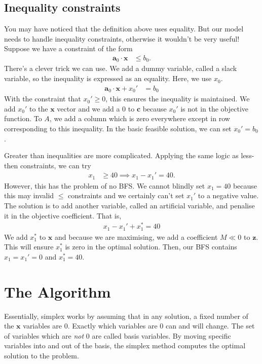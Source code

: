 \documentclass[11pt,a4paper]{article} %
\begin{document}
\subsection{Inequality constraints}
You may have noticed that the definition above uses 
equality. But our model needs to handle inequality constraints, otherwise 
it wouldn't be very useful! Suppose we have a constraint of the form 
\begin{align*}
    \bm a_0 \cdot \bm x &\le b_0.
\end{align*}
There's a clever trick we can use. We add a dummy variable, called a 
slack variable, so the inequality is expressed as an equality. 
Here, we use $x_0$.
\begin{align*}
    \bm a_0 \cdot \bm x + x_0' &= b_0
\end{align*}
With the constraint that $x_0' \ge 0$, this ensures the inequality is 
maintained. 
We add $x_0'$ to the $\bm x$ vector 
and we add a $0$ to $\bm c$ because $x_0'$ is not in the objective function. To $A$, we add 
a column which is zero everywhere except in row corresponding to
this inequality. In the basic feasible solution, we can set 
$x_0' = b_0$.

Greater than inequalities are more complicated. Applying the same logic 
as less-then constraints, we can try
\begin{align*}
    x_1 &\ge 40 \implies x_1-x_1' = 40.
\end{align*}
However, this has the problem of no BFS. We cannot blindly set $x_1=40$ 
because this may invalid $\le$ constraints and we certainly
can't set $x_1'$ to a negative value. The solution is to add another 
variable, called an artificial variable, and penalise it in the objective 
coefficient. That is, 
\begin{align*}
    x_1 - x_1' + x_1^* = 40
\end{align*}
We add $x_1^*$ to $\bm x$ and because we are maximising, 
we add a coefficient $M \ll 0$ to $\bm z$. This will 
ensure $x_1^*$ is zero in the optimal solution. Then, our BFS contains 
$x_1 = x_1' = 0$ and $x_1^* = 40$.

\section{The Algorithm}
Essentially, simplex works by assuming that in any solution,
a fixed number of the $\bm x$ variables are 0. Exactly which 
variables are 0 can and will change. The set of variables which 
are \textit{not} 0 are called basis variables. By moving specific 
variables into and out of the basis, 
the simplex method computes the optimal solution
 to the problem.
\end{document}
